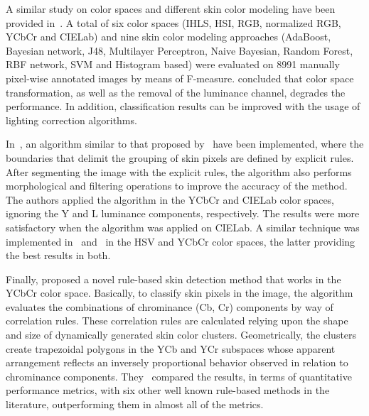 A similar study on color spaces and different skin color modeling have been provided in~\citet{khan:12}. A total of six color spaces (IHLS, HSI, RGB, normalized RGB, YCbCr and CIELab) and nine skin color modeling approaches (AdaBoost, Bayesian network, J48, Multilayer Perceptron, Naive Bayesian, Random Forest, RBF network, SVM and Histogram based) were evaluated on 8991 manually pixel-wise annotated images by means of F-measure. \citet{khan:12} concluded that color space transformation, as well as the removal of the luminance channel, degrades the performance. In addition, classification results can be improved with the usage of lighting correction algorithms.

In~\citet{kaur:12}, an algorithm similar to that proposed by~\citet{kovac:03} have been implemented, where the boundaries that delimit the grouping of skin pixels are defined by explicit rules. After segmenting the image with the explicit rules, the algorithm also performs morphological and filtering operations to improve the accuracy of the method. The authors applied the algorithm in the YCbCr and CIELab color spaces, ignoring the Y and L luminance components, respectively. The results were more satisfactory when the algorithm was applied on CIELab. A similar technique was implemented in~\citet{shaik:15} and~\citet{kumar:15} in the HSV and YCbCr color spaces, the latter providing the best results in both.

Finally, \citet{brancati:17} proposed a novel rule-based skin detection method that works in the YCbCr color space. Basically, to classify skin pixels in the image, the algorithm evaluates the combinations of chrominance (Cb, Cr) components by way of correlation rules. These correlation rules are calculated relying upon the shape and size of dynamically generated skin color clusters. Geometrically, the clusters create trapezoidal polygons in the YCb and YCr subspaces whose apparent arrangement reflects an inversely proportional behavior observed in relation to chrominance components. They~\citep{brancati:17} compared the results, in terms of quantitative performance metrics, with six other well known rule-based methods in the literature, outperforming them in almost all of the metrics.